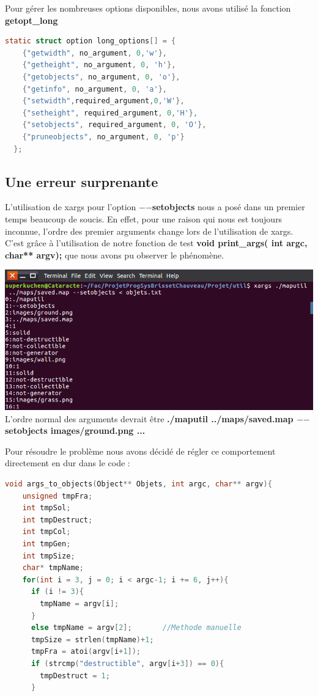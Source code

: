 \documentclass[a4paper]{article}
\begin{document}
Pour gérer les nombreuses options disponibles, nous avons utilisé la fonction \textbf{getopt\_long}
\begin{lstlisting}[language=c]
  static struct option long_options[] = {      
    {"getwidth", no_argument, 0,'w'},
    {"getheight", no_argument, 0, 'h'},
    {"getobjects", no_argument, 0, 'o'},
    {"getinfo", no_argument, 0, 'a'},
    {"setwidth",required_argument,0,'W'},
    {"setheight", required_argument, 0,'H'},
    {"setobjects", required_argument, 0, 'O'},
    {"pruneobjects", no_argument, 0, 'p'}
  };
\end{lstlisting}

\subsection{Une erreur surprenante}
L'utilisation de xargs pour l'option \textbf{$-$$-$setobjects} nous a posé dans un premier temps beaucoup de soucis. En effet, pour une raison qui nous est toujours inconnue, l'ordre des premier arguments change lors de l'utilisation de xargs. C'est grâce à l'utilisation de notre fonction de test \textbf{void print\_args( int argc, char** argv);} que nous avons pu observer le phénomène.



\includegraphics[scale=0.5]{erreurArgs.png}
\\
L'ordre normal des arguments devrait être \textbf{./maputil ../maps/saved.map $-$$-$setobjects images/ground.png ... }

Pour \og résoudre \fg le problème nous avons décidé de régler ce comportement directement en dur dans le code :

\begin{lstlisting}[language=c]
  void args_to_objects(Object** Objets, int argc, char** argv){
    unsigned tmpFra;
    int tmpSol;
    int tmpDestruct;
    int tmpCol;
    int tmpGen;
    int tmpSize;
    char* tmpName;
    for(int i = 3, j = 0; i < argc-1; i += 6, j++){
      if (i != 3){
        tmpName = argv[i];
      }
      else tmpName = argv[2];       //Methode manuelle
      tmpSize = strlen(tmpName)+1;    
      tmpFra = atoi(argv[i+1]);
      if (strcmp("destructible", argv[i+3]) == 0){
        tmpDestruct = 1;
      }
\end{lstlisting}
\end{document}
